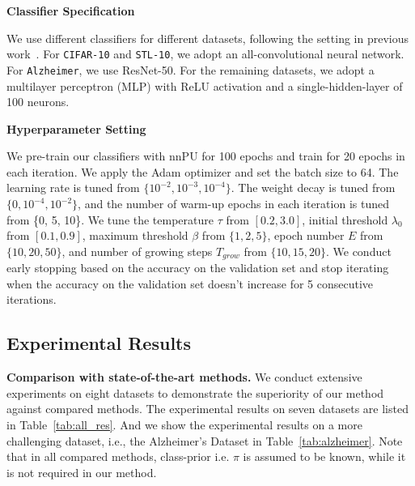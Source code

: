 \documentclass[sigconf]{acmart}
\begin{document}
\noindent\textbf{Classifier Specification}

We use different classifiers for different datasets, following the setting in previous work~\cite{kato2018learning,luo2021pulns}. For \texttt{CIFAR-10} and \texttt{STL-10}, we adopt an all-convolutional neural network. For \texttt{Alzheimer}, we use ResNet-50. For the remaining datasets, we adopt a multilayer perceptron (MLP) with ReLU activation and a single-hidden-layer of 100 neurons.

\noindent\textbf{Hyperparameter Setting}

We pre-train our classifiers with nnPU for 100 epochs and train for 20 epochs in each iteration. We apply the Adam optimizer and set the batch size to 64. The learning rate is tuned from $\{10^{-2}, 10^{-3}, 10^{-4}\}$. The weight decay is tuned from $\{0, 10^{-4}, 10^{-2}\}$, and the number of warm-up epochs in each iteration is tuned from \{0, 5, 10\}. We tune the temperature $\tau$ from $[0.2, 3.0]$, initial threshold $\lambda_0$ from $[0.1, 0.9]$, maximum threshold $\beta$ from $\{1, 2, 5\}$, epoch number $E$ from $\{10, 20, 50\}$, and number of growing steps $T_{grow}$ from $\{10, 15, 20\}$. We conduct early stopping based on the accuracy on the validation set and stop iterating when the accuracy on the validation set doesn't increase for 5 consecutive iterations.

\subsection{Experimental Results}


\textbf{Comparison with state-of-the-art methods.}
We conduct extensive experiments on eight datasets to demonstrate the superiority of our method against compared methods. The experimental results on seven datasets are listed in Table~\ref{tab:all_res}. And we show the experimental results on a more challenging dataset, i.e., the Alzheimer’s Dataset in Table~\ref{tab:alzheimer}. Note that in all compared methods, class-prior i.e. $\pi$ is assumed to be known, while it is not required in our method.
\end{document}
